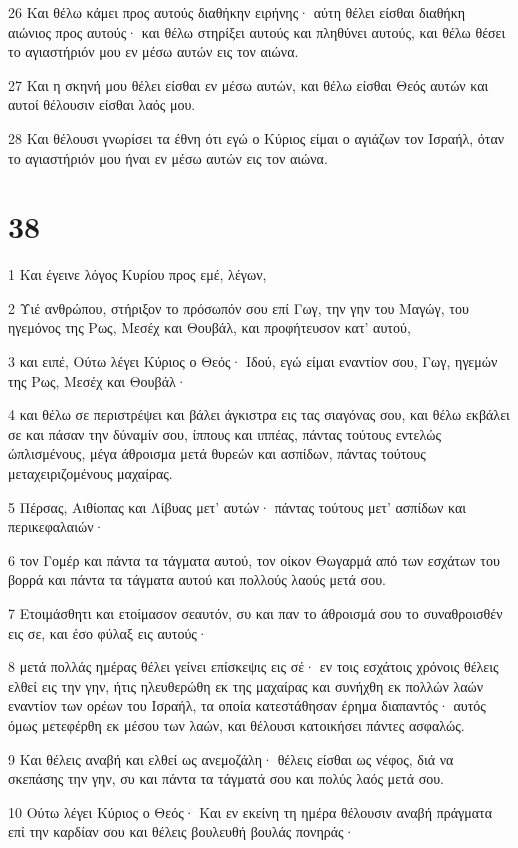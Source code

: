 \par 26 Και θέλω κάμει προς αυτούς διαθήκην ειρήνης· αύτη θέλει είσθαι διαθήκη αιώνιος προς αυτούς· και θέλω στηρίξει αυτούς και πληθύνει αυτούς, και θέλω θέσει το αγιαστήριόν μου εν μέσω αυτών εις τον αιώνα.
\par 27 Και η σκηνή μου θέλει είσθαι εν μέσω αυτών, και θέλω είσθαι Θεός αυτών και αυτοί θέλουσιν είσθαι λαός μου.
\par 28 Και θέλουσι γνωρίσει τα έθνη ότι εγώ ο Κύριος είμαι ο αγιάζων τον Ισραήλ, όταν το αγιαστήριόν μου ήναι εν μέσω αυτών εις τον αιώνα.

\chapter{38}

\par 1 Και έγεινε λόγος Κυρίου προς εμέ, λέγων,
\par 2 Υιέ ανθρώπου, στήριξον το πρόσωπόν σου επί Γωγ, την γην του Μαγώγ, του ηγεμόνος της Ρως, Μεσέχ και Θουβάλ, και προφήτευσον κατ' αυτού,
\par 3 και ειπέ, Ούτω λέγει Κύριος ο Θεός· Ιδού, εγώ είμαι εναντίον σου, Γωγ, ηγεμών της Ρως, Μεσέχ και Θουβάλ·
\par 4 και θέλω σε περιστρέψει και βάλει άγκιστρα εις τας σιαγόνας σου, και θέλω εκβάλει σε και πάσαν την δύναμίν σου, ίππους και ιππέας, πάντας τούτους εντελώς ώπλισμένους, μέγα άθροισμα μετά θυρεών και ασπίδων, πάντας τούτους μεταχειριζομένους μαχαίρας.
\par 5 Πέρσας, Αιθίοπας και Λίβυας μετ' αυτών· πάντας τούτους μετ' ασπίδων και περικεφαλαιών·
\par 6 τον Γομέρ και πάντα τα τάγματα αυτού, τον οίκον Θωγαρμά από των εσχάτων του βορρά και πάντα τα τάγματα αυτού και πολλούς λαούς μετά σου.
\par 7 Ετοιμάσθητι και ετοίμασον σεαυτόν, συ και παν το άθροισμά σου το συναθροισθέν εις σε, και έσο φύλαξ εις αυτούς·
\par 8 μετά πολλάς ημέρας θέλει γείνει επίσκεψις εις σέ· εν τοις εσχάτοις χρόνοις θέλεις ελθεί εις την γην, ήτις ηλευθερώθη εκ της μαχαίρας και συνήχθη εκ πολλών λαών εναντίον των ορέων του Ισραήλ, τα οποία κατεστάθησαν έρημα διαπαντός· αυτός όμως μετεφέρθη εκ μέσου των λαών, και θέλουσι κατοικήσει πάντες ασφαλώς.
\par 9 Και θέλεις αναβή και ελθεί ως ανεμοζάλη· θέλεις είσθαι ως νέφος, διά να σκεπάσης την γην, συ και πάντα τα τάγματά σου και πολύς λαός μετά σου.
\par 10 Ούτω λέγει Κύριος ο Θεός· Και εν εκείνη τη ημέρα θέλουσιν αναβή πράγματα επί την καρδίαν σου και θέλεις βουλευθή βουλάς πονηράς·
